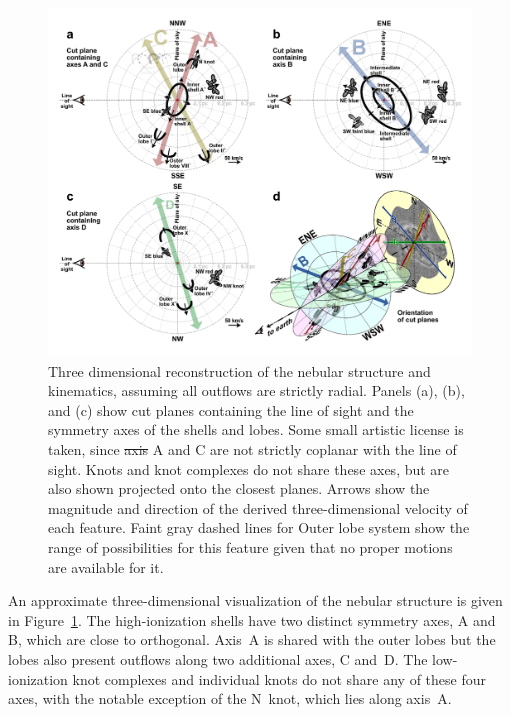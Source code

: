 \documentclass[useAMS, usenatbib]{mnras}
\providecommand{\DIFaddtex}[1]{{\protect\color{red!70!black}\uwave{#1}}} %
\providecommand{\DIFdeltex}[1]{{\protect\color{white!50!black} \ifmmode\cancel{#1}\else\sout{#1}\fi}} %
\providecommand{\DIFaddFL}[1]{\DIFadd{#1}} %
\providecommand{\DIFdelFL}[1]{\DIFdel{#1}} %
\providecommand{\DIFaddbeginFL}{} %
\providecommand{\DIFaddendFL}{} %
\providecommand{\DIFdelbeginFL}{} %
\providecommand{\DIFdelendFL}{} %
\providecommand{\DIFadd}[1]{\texorpdfstring{\DIFaddtex{#1}}{#1}} %
\providecommand{\DIFdel}[1]{\texorpdfstring{\DIFdeltex{#1}}{}} %
\begin{document}
\begin{figure}
  \includegraphics[width=\linewidth]
  {figs/cut-axis-4panel}
  \caption{
    Three dimensional reconstruction of the nebular structure and kinematics,
    assuming all outflows are strictly radial.
    Panels (a), (b), and (c) show cut planes containing the line of sight
    and the symmetry axes of the shells and lobes.
    Some small artistic license is taken, since \DIFdelbeginFL \DIFdelFL{axis }\DIFdelendFL \DIFaddbeginFL \DIFaddFL{axes }\DIFaddendFL A and C are not strictly coplanar with the line of sight.
    Knots and knot complexes do not share these axes, but are also shown projected onto the closest planes.
    Arrows show the magnitude and direction of the derived three-dimensional velocity of each feature.
    Faint gray dashed lines for Outer lobe system  show the range of possibilities for this feature given that no proper motions are available for it.
  }
  \label{fig:cut-axis-3d}
\end{figure}

An approximate three-dimensional visualization of the nebular structure is given in Figure~\ref{fig:cut-axis-3d}.
The high-ionization shells have two distinct symmetry axes, A and B, which are close to orthogonal.
Axis~A is shared with the outer lobes but the lobes also present outflows along two additional axes, C and~D.
The low-ionization knot complexes and individual knots do not share any of these four axes,
with the notable exception of the N~knot, which lies along axis~A.
\end{document}
